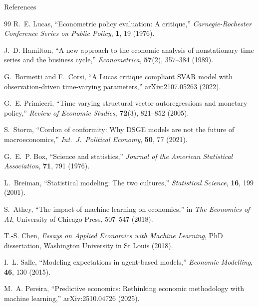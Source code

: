 \documentclass[aspectratio=169, 10pt]{beamer}
\begin{document}
\begin{frame}[allowframebreaks]{References}
  \footnotesize
  \begin{thebibliography}{99}
     R.~E. Lucas, ``Econometric policy evaluation: A critique,''
      \emph{Carnegie-Rochester Conference Series on Public Policy}, \textbf{1}, 19 (1976).

     J.~D. Hamilton, ``A new approach to the economic analysis of
      nonstationary time series and the business cycle,''
      \emph{Econometrica}, \textbf{57}(2), 357--384 (1989).

     G.~Bormetti and F.~Corsi, ``A Lucas critique compliant SVAR
      model with observation-driven time-varying parameters,'' arXiv:2107.05263 (2022).

     G.~E. Primiceri, ``Time varying structural vector
      autoregressions and monetary policy,'' \emph{Review of Economic Studies},
      \textbf{72}(3), 821--852 (2005).

     S.~Storm, ``Cordon of conformity: Why DSGE models are not the
      future of macroeconomics,'' \emph{Int.\ J.\ Political Economy},
      \textbf{50}, 77 (2021).

     G.~E.~P. Box, ``Science and statistics,''
      \emph{Journal of the American Statistical Association}, \textbf{71}, 791 (1976).

     L.~Breiman, ``Statistical modeling: The two cultures,''
      \emph{Statistical Science}, \textbf{16}, 199 (2001).

     S.~Athey, ``The impact of machine learning on economics,''
      in \emph{The Economics of AI}, University of Chicago Press, 507--547 (2018).

     T.-S. Chen, \emph{Essays on Applied Economics with Machine Learning},
      PhD dissertation, Washington University in St Louis (2018).

     I.~L. Salle, ``Modeling expectations in agent-based models,''
      \emph{Economic Modelling}, \textbf{46}, 130 (2015).

     M.~A. Pereira, ``Predictive economics: Rethinking economic
      methodology with machine learning,'' arXiv:2510.04726 (2025).
  \end{thebibliography}
\end{frame}
\end{document}
